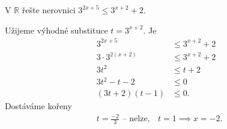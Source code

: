 \begin{priklad}\label{expnerce}
V $\mathbb R$ řešte nerovnici $3^{2x+5}\leq 3^{x+2}+2.$
\end{priklad}

\begin{reseni}
Užijeme výhodné substituce $t=3^{x+2}$. Je
\begin{align*}
	3^{2x+5}&\leq 3^{x+2}+2\\
	3\cdot 3^{2(x+2)} &\leq 3^{x+2} + 2\\
	3t^2 &\leq t + 2\\
	3t^2 - t - 2 &\leq 0\\
	(3t+2)(t-1) &\leq 0.
\end{align*}
Dostáváme kořeny
\begin{align*}
	&t=\frac{-2}{3} \text{ -- nelze}, &t=1 \implies x = -2.
\end{align*}
\vspace{-1em}
\begin{figure}[!ht]
	\centering
\end{figure}
\end{reseni}
